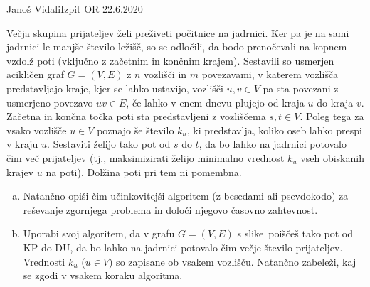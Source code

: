 \begin{naloga}{Janoš Vidali}{Izpit OR 22.6.2020}
\begin{vprasanje}
Večja skupina prijateljev želi preživeti počitnice na jadrnici.
Ker pa je na sami jadrnici le manjše število ležišč,
so se odločili, da bodo prenočevali na kopnem vzdolž poti
(vključno z začetnim in končnim krajem).
Sestavili so usmerjen acikličen graf $G = (V, E)$
z $n$ vozlišči in $m$ povezavami,
v katerem vozlišča predstavljajo kraje, kjer se lahko ustavijo,
vozlišči $u, v \in V$ pa sta povezani z usmerjeno povezavo $uv \in E$,
če lahko v enem dnevu plujejo od kraja $u$ do kraja $v$.
Začetna in končna točka poti sta predstavljeni z vozliščema $s, t \in V$.
Poleg tega za vsako vozlišče $u \in V$ poznajo še število $k_u$,
ki predstavlja, koliko oseb lahko prespi v kraju $u$.
Sestaviti želijo tako pot od $s$ do $t$,
da bo lahko na jadrnici potovalo čim več prijateljev
(tj., maksimizirati želijo minimalno vrednost $k_u$
vseh obiskanih krajev $u$ na poti).
Dolžina poti pri tem ni pomembna.

\begin{enumerate}[(a)]
\item Natančno opiši čim učinkovitejši algoritem (z besedami ali psevdokodo)
za reševanje zgornjega problema
in določi njegovo časovno zahtevnost.
\item Uporabi svoj algoritem,
da v grafu $G = (V, E)$ s slike~\fig poiščeš tako pot od KP do DU,
da bo lahko na jadrnici potovalo čim večje število prijateljev.
Vrednosti $k_u$ ($u \in V$) so zapisane ob vsakem vozlišču.
Natančno zabeleži, kaj se zgodi v vsakem koraku algoritma.
\end{enumerate}

\begin{slika}
\pgfslika
{}
\end{slika}
\end{vprasanje}


\end{naloga}
